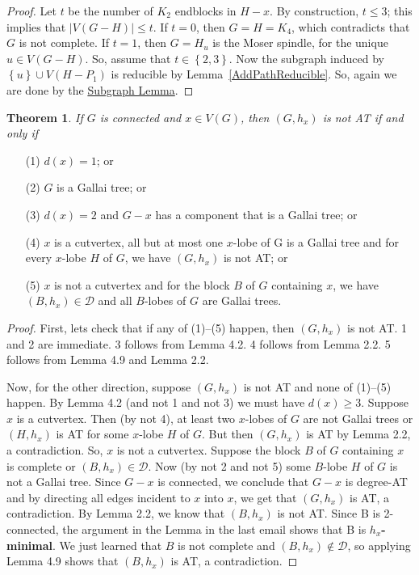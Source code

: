 \documentclass[12pt]{article}
\theoremstyle{plain}
\newtheorem{thm}{Theorem}[section]
\theoremstyle{definition}
\theoremstyle{remark}
\newcommand{\fancy}[1]{\mathcal{#1}}
\newcommand{\D}{\fancy{D}}
\newcommand{\set}[1]{\left\{ #1 \right\}}
\def\D{\fancy{D}}
\begin{document}
\begin{proof}
Let $t$ be the number of $K_2$ endblocks in $H-x$.
By construction, $t\le 3$; this implies that $|V(G - H)| \le t$.   
If $t = 0$, then $G = H = K_4$, which contradicts that $G$ is not complete.  
If $t=1$, then $G = H_u$ is the Moser spindle, for the unique $u \in V(G-H)$. 
So, assume that $t \in \set{2,3}$.  
Now %
the subgraph induced by $\set{u}\cup V(H-P_1)$  
is reducible by Lemma~\ref{AddPathReducible}. %
So, again we are done by the
\hyperref[InducedSubgraph]{Subgraph Lemma}.  
\end{proof}


\begin{thm}
If $G$ is connected and $x \in V(G)$, then $(G, h_x)$ is not AT if and only if
\end{thm}

\begin{enumerate}
\item[(1)] $d(x) = 1$; or
\item[(2)] $G$ is a Gallai tree; or
\item[(3)] $d(x) = 2$ and $G-x$ has a component that is a Gallai tree; or
\item[(4)] $x$ is a cutvertex, all but at most one $x$-lobe of G is a Gallai
tree and for every $x$-lobe $H$ of $G$, we have $(G, h_x)$ is not AT; or
\item[(5)] $x$ is not a cutvertex and for the block $B$ of $G$ containing $x$,
we have $(B,h_x) \in \D$ and all $B$-lobes of $G$ are Gallai trees.
\end{enumerate}

\begin{proof}
First, lets check that if any of (1)--(5) happen, then $(G, h_x)$ is not AT.  1 and 2
are immediate.  3 follows from Lemma 4.2. 4 follows from Lemma 2.2. 5 follows
from Lemma 4.9 and Lemma 2.2.

Now, for the other direction, suppose $(G, h_x)$ is not AT and none of
(1)--(5) happen.  By Lemma 4.2 (and not 1 and not 3) we must have $d(x) \ge 3$. 
Suppose $x$ is a cutvertex.  Then (by not 4), at least two $x$-lobes of $G$ are
not Gallai trees or $(H, h_x)$ is AT for some $x$-lobe $H$ of $G$.  But then
$(G,h_x)$ is AT by Lemma 2.2, a contradiction.  So, $x$ is not a cutvertex. 
Suppose the block $B$ of $G$ containing $x$ is complete or $(B,h_x) \in \D$. 
Now (by not 2 and not 5) some $B$-lobe $H$ of $G$ is not a Gallai tree.  Since
$G-x$ is connected, we conclude that $G-x$ is degree-AT and by directing all
edges incident to $x$ into $x$, we get that $(G,h_x)$ is AT, a contradiction. 
By Lemma 2.2, we know that $(B, h_x)$ is not AT. Since B is 2-connected, the
argument in the Lemma in the last email
shows that B is \textbf{$h_x$-minimal}.  We just learned that $B$ is not
complete and $(B,h_x) \not \in \D$, so applying Lemma 4.9 shows that $(B, h_x)$
is AT, a contradiction.
\end{proof}
\end{document}
